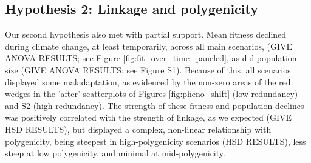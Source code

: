 \documentclass[9pt,twocolumn,twoside,lineno]{pnas-new}
\begin{document}
\subsection{Hypothesis 2: Linkage and polygenicity}
Our second hypothesis also met with partial support.
Mean fitness declined during climate change, at least temporarily, across all main scenarios, (GIVE ANOVA 
RESULTS; see Figure \ref{fig:fit_over_time_paneled}, as did population size (GIVE ANOVA 
RESULTS; see Figure S1).
Because of this, all scenarios displayed some maladaptation, as evidenced by the non-zero areas of the red wedges
in the 'after' scatterplots of Figures \ref{fig:pheno_shift} (low redundancy) and S2 (high redundancy).
The strength of these fitness and population declines was 
positively correlated with the strength of linkage, as we expected (GIVE HSD RESULTS),
but displayed a complex, non-linear relationship with polygenicity,
being steepest in high-polygenicity
scenarios (HSD RESULTS), less steep at low polygenicity, and minimal at
mid-polygenicity. 
\end{document}

